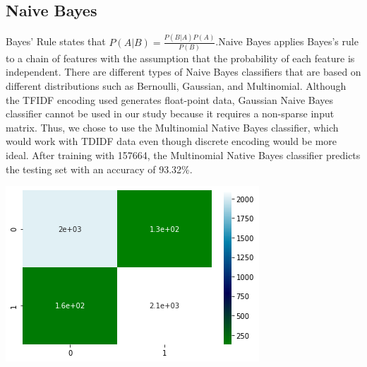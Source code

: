 \documentclass{article}
\begin{document}
\begin{multicols}{2}
\subsection{Naive Bayes}
Bayes' Rule states that $P(A|B)=\frac{P(B|A)P(A)}{P(B)}$.Naive Bayes applies Bayes's rule to a chain of features with the assumption that the probability of each feature is independent. There are different types of Naive Bayes classifiers that are based on different distributions such as Bernoulli, Gaussian, and Multinomial. Although the TFIDF encoding used generates float-point data, Gaussian Naive Bayes classifier cannot be used in our study because it requires a non-sparse input matrix. Thus, we chose to use the Multinomial Native Bayes classifier, which would work with TDIDF data even though discrete encoding would be more ideal. After training with 157664, the Multinomial Native Bayes classifier predicts the testing set with an accuracy of 93.32\%.

\includegraphics[scale=0.6]{images/nbcm.png}


\end{multicols}
\end{document}
